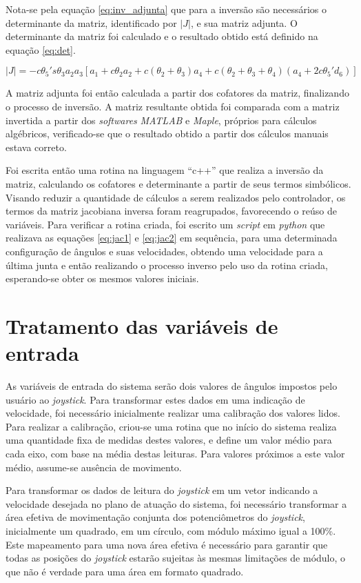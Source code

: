 Nota-se pela equação \ref{eq:inv_adjunta} que para a inversão são necessários o determinante da matriz,
identificado por $|J|$, e sua matriz adjunta. O determinante da matriz foi calculado e o resultado obtido
está definido na equação \ref{eq:det}.

\begin{equation}
    \label{eq:det}
    |J| = -c\theta_5's\theta_3a_2a_3[a_1+c\theta_2a_2+c(\theta_2+\theta_3)a_4+c(\theta_2+\theta_3+\theta_4)(a_4+2c\theta_5'd_6)]  
\end{equation}

A matriz adjunta foi então calculada a partir dos cofatores da matriz, finalizando o 
processo de inversão. 
A matriz resultante obtida foi comparada com a matriz invertida a partir dos \textit{softwares}
\textit{MATLAB} e \textit{Maple}, próprios para cálculos algébricos, verificado-se que o 
resultado obtido a partir dos cálculos manuais estava correto.

Foi escrita então uma rotina na linguagem ``c++'' que realiza a inversão da 
matriz, calculando os cofatores e determinante a partir de seus termos simbólicos. 
Visando reduzir a quantidade de cálculos a serem realizados pelo controlador, os termos da 
matriz jacobiana inversa foram reagrupados, favorecendo o reúso de variáveis.
Para verificar a rotina criada, foi escrito um \textit{script} em \textit{python}
que realizava as equações \ref{eq:jac1} e \ref{eq:jac2} em sequência, para uma 
determinada configuração de ângulos e suas velocidades, obtendo uma velocidade para 
a última junta e então realizando o processo inverso pelo uso da rotina criada, esperando-se 
obter os mesmos valores iniciais.

\section{Tratamento das variáveis de entrada}
As variáveis de entrada do sistema serão dois valores de ângulos impostos pelo
usuário ao \textit{joystick}. Para transformar estes dados em uma indicação de 
velocidade, foi necessário inicialmente realizar uma calibração dos valores lidos.
Para realizar a calibração, criou-se uma rotina que no início do sistema 
realiza uma quantidade fixa de medidas destes valores, e define um valor médio para
cada eixo, com base na média destas leituras. Para valores próximos a este valor médio,
assume-se ausência de movimento.

Para transformar os dados de leitura do \textit{joystick} em um vetor indicando
a velocidade desejada no plano de atuação do sistema, foi necessário transformar
a área efetiva de movimentação conjunta dos potenciômetros do \textit{joystick},
inicialmente um quadrado, em um círculo, com módulo máximo igual a 100\%.
Este mapeamento para uma nova área efetiva é necessário para 
garantir que todas as posições do \textit{joystick} estarão sujeitas às mesmas 
limitações de módulo, o que não é verdade para uma área em formato quadrado.

